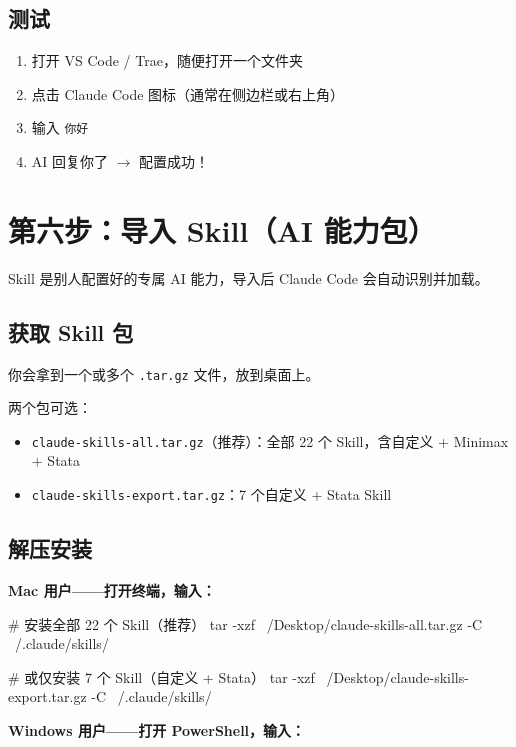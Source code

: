 \documentclass[12pt,a4paper]{ctexart}
\begin{document}
\subsection{测试}

\begin{enumerate}[nosep]
    \item 打开 VS Code / Trae，随便打开一个文件夹
    \item 点击 Claude Code 图标（通常在侧边栏或右上角）
    \item 输入 \texttt{你好}
    \item AI 回复你了 $\to$ 配置成功！
\end{enumerate}

\section{第六步：导入 Skill（AI 能力包）}

Skill 是别人配置好的专属 AI 能力，导入后 Claude Code 会自动识别并加载。

\subsection{获取 Skill 包}

你会拿到一个或多个 \texttt{.tar.gz} 文件，放到桌面上。

两个包可选：

\begin{itemize}[nosep]
    \item \texttt{claude-skills-all.tar.gz}（推荐）：全部 22 个 Skill，含自定义 + Minimax + Stata
    \item \texttt{claude-skills-export.tar.gz}：7 个自定义 + Stata Skill
\end{itemize}

\subsection{解压安装}

\textbf{Mac 用户——打开终端，输入：}

\begin{shcode}
# 安装全部 22 个 Skill（推荐）
tar -xzf ~/Desktop/claude-skills-all.tar.gz -C ~/.claude/skills/

# 或仅安装 7 个 Skill（自定义 + Stata）
tar -xzf ~/Desktop/claude-skills-export.tar.gz -C ~/.claude/skills/
\end{shcode}

\textbf{Windows 用户——打开 PowerShell，输入：}
\end{document}
